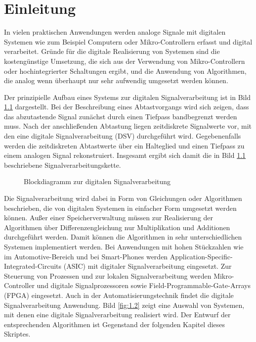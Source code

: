 \chapter{Einleitung}\label{sec:einleitung}

In vielen praktischen Anwendungen werden analoge Signale mit digitalen Systemen wie zum Beispiel Computern oder Mikro-Controllern erfasst und digital verarbeitet. Gründe für die digitale Realisierung von Systemen sind die kostengünstige Umsetzung, die sich aus der Verwendung von Mikro-Controllern oder hochintegrierter Schaltungen ergibt, und die Anwendung von Algorithmen, die analog wenn überhaupt nur sehr aufwendig umgesetzt werden können.

Der prinzipielle Aufbau eines Systems zur digitalen Signalverarbeitung ist in Bild \ref{fig:1.1} dargestellt. Bei der Beschreibung eines Abtastvorgangs wird sich zeigen, dass das abzutastende Signal zunächst durch einen Tiefpass bandbegrenzt werden muss. Nach der anschließenden Abtastung liegen zeitdiskrete Signalwerte vor, mit den eine digitale Signalverarbeitung (DSV) durchgeführt wird. Gegebenenfalls werden die zeitdiskreten Abtastwerte über ein Halteglied und einen Tiefpass zu einem analogen Signal rekonstruiert. Insgesamt ergibt sich damit die in Bild \ref{fig:1.1} beschriebene Signalverarbeitungskette.

\begin{figure}
  \centering
  
  \caption{Blockdiagramm zur digitalen Signalverarbeitung}
  \label{fig:1.1}
\end{figure}

Die Signalverarbeitung wird dabei in Form von Gleichungen oder Algorithmen beschrieben, die von digitalen Systemen in einfacher Form umgesetzt werden können. Außer einer Speicherverwaltung müssen zur Realisierung der Algorithmen über Differenzengleichung nur Multiplikation und Additionen durchgeführt werden. Damit können die Algorithmen in sehr unterschiedlichen Systemen implementiert werden. Bei Anwendungen mit hohen Stückzahlen wie im Automotive-Bereich und bei Smart-Phones werden Application-Specific-Integrated-Circuits (ASIC) mit digitaler Signalverarbeitung eingesetzt. Zur Steuerung von Prozessen und zur lokalen Signalverarbeitung werden Mikro-Controller und digitale Signalprozessoren sowie Field-Programmable-Gate-Arrays (FPGA) eingesetzt. Auch in der Automatisierungstechnik findet die digitale Signalverarbeitung Anwendung. Bild \ref{fig:1.2} zeigt eine Auswahl von Systemen, mit denen eine digitale Signalverarbeitung realisiert wird. Der Entwurf der entsprechenden Algorithmen ist Gegenstand der folgenden Kapitel dieses Skriptes.

